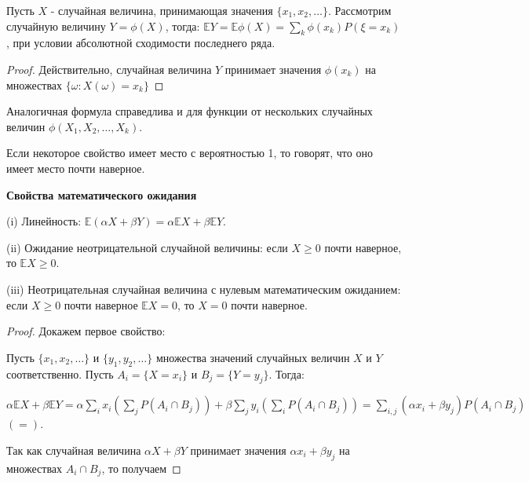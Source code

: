 \documentclass[a4paper]{article}
\begin{document}
\begin{colloq}
   	\begin{theorem*}
   		Пусть $X$ - случайная величина, принимающая значения $\{ x_1, x_2, \dots \}$. Рассмотрим случайную величину $Y = \phi(X)$, тогда: $\mathbb{E} Y= \mathbb{E} \phi(X) = \sum_{k} \phi(x_k) P(\xi = x_k)$,
   		при условии абсолютной сходимости последнего ряда.
   	\end{theorem*}
   	
   	\begin{proof}
   		Действительно, случайная величина $Y$ принимает значения $\phi(x_k)$ на множествах $\{ \omega: X(\omega)=x_k \}$	
   	\end{proof}

   	Аналогичная формула справедлива и для функции от нескольких случайных величин $\phi(X_1, X_2, \dots, X_k)$.
   	
   	\begin{definition*}
   		Если некоторое свойство имеет место с вероятностью 1, то говорят, что оно имеет место почти наверное.
   	\end{definition*}
   	
   	\textbf{Свойства математического ожидания}
   	
   	(i) Линейность: $\mathbb{E}(\alpha X + \beta Y) = \alpha \mathbb{E}X + \beta \mathbb{E}Y$.
   		
	(ii) Ожидание неотрицательной случайной величины: если $X \geqslant 0$ почти наверное, то $\mathbb{E}X \geqslant 0$.
   			
	(iii) Неотрицательная случайная величина с нулевым математическим ожиданием: если $X \geqslant 0$ почти наверное $\mathbb{E}X = 0$, то $X = 0$ почти наверное.

   	
   	\begin{proof}
   		Докажем первое свойство:
   		
   		Пусть $\{ x_1, x_2, \dots \}$ и $\{ y_1, y_2, \dots \}$ множества значений случайных величин $X$ и $Y$ соответственно. Пусть $A_i=\{ X = x_i \}$ и $B_j=\{ Y  =y_j \}$. Тогда:
   		
   		$\alpha \mathbb{E}X + \beta \mathbb{E}Y = \alpha \sum_{i} x_i \left( \sum_{j} P(A_i \cap B_j) \right) + \beta \sum_{j} y_i \left( \sum_{i} P(A_i \cap B_j) \right) = \sum_{i, j} (\alpha x_i + \beta y_j) P(A_i \cap B_j)$ $(=)$.
   		
   		Так как случайная величина $\alpha X + \beta Y$ принимает значения $\alpha x_i + \beta y_j$ на множествах $A_i \cap B_j$, то получаем 
   		

\end{proof}
\end{colloq}
\end{document}
